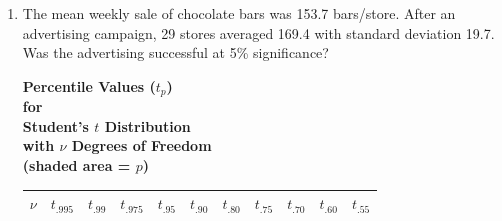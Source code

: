 \documentclass[12pt,a4paper]{article}
\begin{document}
\begin{enumerate}
\item The mean weekly sale of chocolate bars was 153.7 bars/store. After an advertising campaign, 29 stores averaged 169.4 with standard deviation 19.7. Was the advertising successful at 5\% significance?


\begin{center}
\begin{minipage}{0.45\textwidth}
    \centering
    \textbf{\large Percentile Values ($t_p$)} \\
    \vspace{0.2cm}
    \textbf{for} \\
    \vspace{0.2cm}
    \textbf{Student's $t$ Distribution} \\
    \vspace{0.2cm}
    \textbf{with $\nu$ Degrees of Freedom} \\
    \vspace{0.2cm}
    \textbf{(shaded area = $p$)}
\end{minipage}
\hfill
\begin{minipage}{0.45\textwidth}
    \centering
\end{minipage}
\end{center}
\vspace{0.5cm}

\begin{center}
\begin{longtable}{c | ccccc | ccccc}
\toprule
$\nu$ & $t_{.995}$ & $t_{.99}$ & $t_{.975}$ & $t_{.95}$ & $t_{.90}$ & $t_{.80}$ & $t_{.75}$ & $t_{.70}$ & $t_{.60}$ & $t_{.55}$ \\
\midrule
\endhead


\end{longtable}
\end{center}
\end{enumerate}
\end{document}
